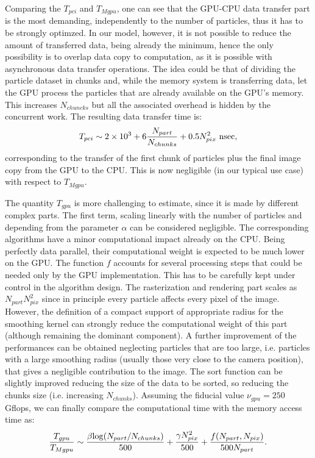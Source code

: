 \documentclass[11pt]{article}
\begin{document}
Comparing the $T_{pci}$ and $T_{Mgpu}$, one can see that the GPU-CPU data transfer
part is the most demanding, independently to the number of particles, thus
it has to be strongly optimzed. In our model, however, it is not possible to 
reduce the amount of transferred data, being already the minimum, hence the only possibility is to
overlap data copy to computation, as it is possible with asynchronous
data transfer operations. The idea could be that of dividing the particle 
dataset in chunks and, while the memory system is transferring data,
let the GPU process the particles that are already available on the 
GPU's memory. This increases $N_{chuncks}$ but all the associated overhead 
is hidden by the concurrent work. The resulting data transfer time is:
\begin{equation}
T_{pci} \sim 2 \times 10^3 + 6 {N_{part}\over N_{chunks}} + 0.5 N_{pix}^2\ {\rm nsec},
\end{equation}
corresponding to the transfer of the first chunk of particles plus the final image copy 
from the GPU to the CPU. This is now negligible (in our typical use case) with respect to
$T_{Mgpu}$.

The quantity $T_{gpu}$ is more challenging to estimate, since it is made by different 
complex parts. The first term, scaling linearly with the number of particles and depending 
from the parameter $\alpha$ can be considered negligible. The corresponding 
algorithms have a minor computational impact already on the CPU. Being perfectly 
data parallel, their computational weight is expected to be much lower on the GPU.
The function $f$ accounts for several processing steps that could be needed only
by the GPU implementation. This has to be carefully kept under control in 
the algorithm design. The rasterization and rendering part scales as $N_{part}
N_{pix}^2$ since in principle every particle affects every pixel of the image.
However, the definition of a compact support of appropriate radius for the smoothing
kernel can strongly reduce the computational weight of this part (although remaining
the dominant component). A further improvement of the performances can be obtained
neglecting particles that are too large, i.e. particles with a large smoothing radius 
(usually those very close to the camera position), that gives a negligible
contribution to the image. The sort function can be slightly improved reducing 
the size of the data to be sorted, so reducing the chunks size (i.e. increasing 
$N_{chunks}$). 
Assuming the fiducial value $\nu_{gpu} = 250$ Gflops, we can finally compare the computational time with the memory access time as:
\begin{equation}
{T_{gpu}\over T_{Mgpu}} \sim 
{\beta {\rm log}(N_{part}/N_{chunks})\over 500} +
{\gamma N_{pix}^2\over 500} + 
{f(N_{part},N_{pix})\over 500 N_{part}}.
\end{equation}
\end{document}
